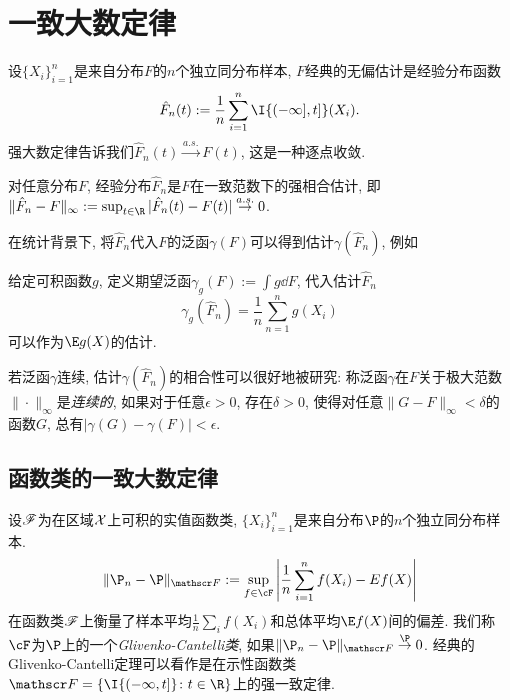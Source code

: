 \section{一致大数定律}

设$\{X_i\}_{i=1}^n$是来自分布$F$的$n$个独立同分布样本, $F$经典的无偏估计是经验分布函数
\begin{equation*}
	\hat F_n(t) := \frac{1}{n} \sum_{i=1}^n \I{(-\infty], t]}(X_i). 
\end{equation*}
强大数定律告诉我们$\hat F_n(t) \stackrel{a.s.}{\to} F(t)$, 这是一种逐点收敛. 

\begin{theorem}\label{thm:Glivenko-Cantelli}
		对任意分布$F$, 经验分布$\hat F_n$是$F$在一致范数下的强相合估计, 即$\|\hat F_n - F\|_{\infty} := \sup_{t \in \R} |\hat F_n(t) - F(t)| \stackrel{a.s.}{\to} 0$. 
\end{theorem}

在统计背景下,  将$\hat F_n$代入$F$的泛函$\gamma(F)$可以得到估计$\gamma(\hat F_n)$, 例如

\begin{example}
	给定可积函数$g$, 定义期望泛函$\gamma_g(F) := \int g \dd F$, 代入估计$\hat F_n$
	\begin{equation*}
		\gamma_g(\hat F_n) = \frac{1}{n} \sum_{n=1}^n g(X_i)
	\end{equation*}
	可以作为$\E g(X)$的估计. 
\end{example}

若泛函$\gamma$连续, 估计$\gamma(\hat F_n)$的相合性可以很好地被研究: 称泛函$\gamma$在$F$关于极大范数$\| \cdot \|_{\infty}$是\emph{连续的}, 如果对于任意$\epsilon > 0$, 存在$\delta > 0$, 使得对任意$\|G - F\|_{\infty} < \delta$的函数$G$, 总有$|\gamma(G) - \gamma(F)| < \epsilon$. 

\subsection{函数类的一致大数定律}

设$\mathscr{F}$为在区域$\mathcal{X}$上可积的实值函数类, $\{X_i\}_{i=1}^n$是来自分布$\P$的$n$个独立同分布样本. 
\begin{equation*}
	\|\P_n - \P\|_{\sF} := \sup_{f \in\cF} \left| \frac{1}{n} \sum_{i=1}^n f(X_i) - E f(X) \right|
\end{equation*}
在函数类$\mathscr{F}$上衡量了样本平均$\frac{1}{n} \sum_i f(X_i)$和总体平均$\E f(X)$间的偏差. 
我们称$\cF$为$\P$上的一个\emph{Glivenko-Cantelli类}, 如果$\|\P_n - \P\|_{\sF} \stackrel{\P}{\to} 0$. 
经典的Glivenko-Cantelli定理可以看作是在示性函数类$\sF = \{\I{(- \infty, t]} \colon t \in \R \}$上的强一致定律. 



